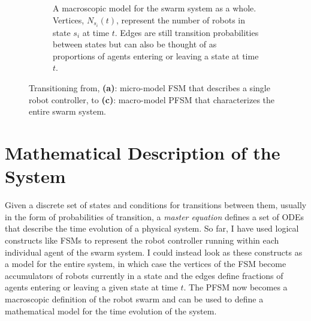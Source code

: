 \documentclass[defaultstyle,12pt]{proposal}
\begin{document}
\begin{figure}[!t]
\begin{subfigure}[t]{.4\textwidth}
	\caption{A macroscopic model for the swarm system as a whole. Vertices, $N_{s_i}(t)$, represent the number of robots in state $s_i$ at time $t$. Edges are still transition probabilities between states but can also be thought of as proportions of agents entering or leaving a state at time $t$.}\label{fig:pfsmmacro}
	\end{subfigure}
\caption{Transitioning from, \textbf{(a)}: micro-model FSM that describes a single robot controller, to \textbf{(c)}: macro-model PFSM that characterizes the entire swarm system.}\label{fig:allfsm}
\end{figure}

\section{Mathematical Description of the System}
Given a discrete set of states and conditions for transitions between them, usually in the form of probabilities of transition, a \emph{master equation} defines a set of ODEs that describe the time evolution of a physical system. So far, I have used logical constructs like FSMs to represent the robot controller running within each individual agent of the swarm system. I could instead look as these constructs as a model for the entire system, in which case the vertices of the FSM become accumulators of robots currently in a state and the edges define fractions of agents entering or leaving a given state at time $t$. The PFSM now becomes a macroscopic definition of the robot swarm and can be used to define a mathematical model for the time evolution of the system.
\end{document}
